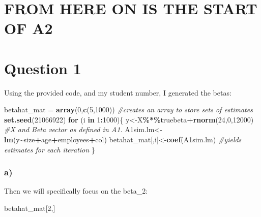 \documentclass[
]{article}
\newenvironment{Shaded}{\begin{snugshade}}{\end{snugshade}}
\newcommand{\CommentTok}[1]{\textcolor[rgb]{0.56,0.35,0.01}{\textit{#1}}}
\newcommand{\ControlFlowTok}[1]{\textcolor[rgb]{0.13,0.29,0.53}{\textbf{#1}}}
\newcommand{\DecValTok}[1]{\textcolor[rgb]{0.00,0.00,0.81}{#1}}
\newcommand{\FunctionTok}[1]{\textcolor[rgb]{0.13,0.29,0.53}{\textbf{#1}}}
\newcommand{\NormalTok}[1]{#1}
\newcommand{\OtherTok}[1]{\textcolor[rgb]{0.56,0.35,0.01}{#1}}
\newcommand{\SpecialCharTok}[1]{\textcolor[rgb]{0.81,0.36,0.00}{\textbf{#1}}}
\begin{document}
\section{FROM HERE ON IS THE START OF
A2}\label{from-here-on-is-the-start-of-a2}

\section{Question 1}\label{question-1}

Using the provided code, and my student number, I generated the betas:

\begin{Shaded}
\begin{Highlighting}[]
\NormalTok{betahat\_mat }\OtherTok{=} \FunctionTok{array}\NormalTok{(}\DecValTok{0}\NormalTok{,}\FunctionTok{c}\NormalTok{(}\DecValTok{5}\NormalTok{,}\DecValTok{1000}\NormalTok{)) }\CommentTok{\#creates an array to store sets of estimates}
\FunctionTok{set.seed}\NormalTok{(}\DecValTok{21066922}\NormalTok{)}
\ControlFlowTok{for}\NormalTok{ (i }\ControlFlowTok{in} \DecValTok{1}\SpecialCharTok{:}\DecValTok{1000}\NormalTok{)\{}
\NormalTok{  y}\OtherTok{\textless{}{-}}\NormalTok{X}\SpecialCharTok{\%*\%}\NormalTok{truebeta}\SpecialCharTok{+}\FunctionTok{rnorm}\NormalTok{(}\DecValTok{24}\NormalTok{,}\DecValTok{0}\NormalTok{,}\DecValTok{12000}\NormalTok{) }\CommentTok{\#X and Beta vector as defined in A1.}
\NormalTok{  A1sim.lm}\OtherTok{\textless{}{-}}\FunctionTok{lm}\NormalTok{(y}\SpecialCharTok{\textasciitilde{}}\NormalTok{size}\SpecialCharTok{+}\NormalTok{age}\SpecialCharTok{+}\NormalTok{employees}\SpecialCharTok{+}\NormalTok{col)}
\NormalTok{  betahat\_mat[,i]}\OtherTok{\textless{}{-}}\FunctionTok{coef}\NormalTok{(A1sim.lm) }\CommentTok{\#yields estimates for each iteration}
\NormalTok{\}}
\end{Highlighting}
\end{Shaded}

\subsubsection{a)}\label{a}

Then we will specifically focus on the beta\_2:

\begin{Shaded}
\begin{Highlighting}[]
\NormalTok{betahat\_mat[}\DecValTok{2}\NormalTok{,]}
\end{Highlighting}
\end{Shaded}
\end{document}
